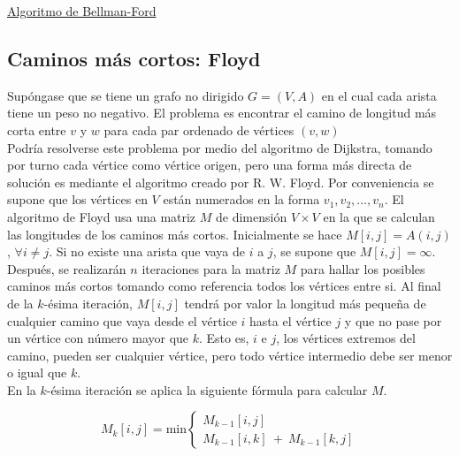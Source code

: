 \underline{Algoritmo de Bellman-Ford}\\


\subsection{Caminos más cortos: Floyd}
\label{sec:floyd}

Supóngase que se tiene un grafo no dirigido $G = (V,A)$ en el cual cada arista tiene un peso no negativo. El problema es encontrar el camino de longitud más corta entre $v$ y $w$ para cada par ordenado de vértices $(v,w)$\\

Podría resolverse este problema por medio del algoritmo de Dijkstra, tomando por turno cada vértice como vértice origen, pero una forma más directa de solución es mediante el algoritmo creado por R. W. Floyd. Por conveniencia se supone que los vértices en $V$ están numerados en la forma $v_1, v_2, \ldots, v_n$. El algoritmo de Floyd usa una matriz $M$ de dimensión $V \times V$ en la que se calculan las longitudes de los caminos más cortos. Inicialmente se hace $M[i,j] = A(i,j)$, $\forall i \neq j$. Si no existe una arista que vaya de $i$ a $j$, se supone que $M[i,j] = \infty$.\\

Después, se realizarán $n$ iteraciones para la matriz $M$ para hallar los posibles caminos más cortos tomando como referencia todos los vértices entre si. Al final de la $k$-ésima iteración, $M[i,j]$ tendrá por valor la longitud más pequeña de cualquier camino que vaya desde el vértice $i$ hasta el vértice $j$ y que no pase por un vértice con número mayor que $k$. Esto es, $i$ e $j$, los vértices extremos del camino, pueden ser cualquier vértice, pero todo vértice intermedio debe ser menor o igual que $k$.\\

En la $k$-ésima iteración se aplica la siguiente fórmula para calcular $M$.

\[ M_k[i,j] = \mbox{min}
\left\{ 
  \begin{array}{l} 
    M_{k-1}[i,j]  \\ 
    M_{k-1}[i,k]\ +\ M_{k-1}[k,j]
  \end{array} 
\right. \]

